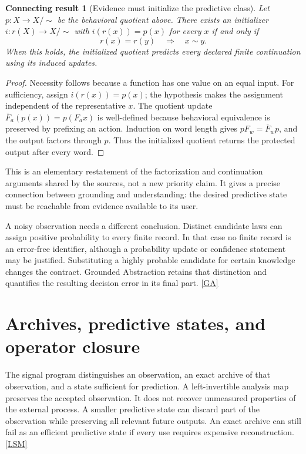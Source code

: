 \documentclass[11pt,oneside]{article}
\newcommand{\src}[1]{\hyperlink{cat:#1}{\textsf{[#1]}}}
\newtheorem{connection}{Connecting result}
\begin{document}
\begin{connection}[Evidence must initialize the predictive class]
Let $p:X\to X/{\sim}$ be the behavioral quotient above. There exists an initializer $i:r(X)\to X/{\sim}$ with $i(r(x))=p(x)$ for every $x$ if and only if
\[
r(x)=r(y)\quad\Longrightarrow\quad x\sim y.
\]
When this holds, the initialized quotient predicts every declared finite continuation using its induced updates.
\end{connection}
\begin{proof}
Necessity follows because a function has one value on an equal input. For sufficiency, assign $i(r(x))=p(x)$; the hypothesis makes the assignment independent of the representative $x$. The quotient update $\overline F_a(p(x))=p(F_ax)$ is well-defined because behavioral equivalence is preserved by prefixing an action. Induction on word length gives $pF_w=\overline F_wp$, and the output factors through $p$. Thus the initialized quotient returns the protected output after every word.
\end{proof}

This is an elementary restatement of the factorization and continuation arguments shared by the sources, not a new priority claim. It gives a precise connection between grounding and understanding: the desired predictive state must be reachable from evidence available to its user.

A noisy observation needs a different conclusion. Distinct candidate laws can assign positive probability to every finite record. In that case no finite record is an error-free identifier, although a probability update or confidence statement may be justified. Substituting a highly probable candidate for certain knowledge changes the contract. Grounded Abstraction retains that distinction and quantifies the resulting decision error in its final part. \src{GA}

\section{Archives, predictive states, and operator closure}
The signal program distinguishes an observation, an exact archive of that observation, and a state sufficient for prediction. A left-invertible analysis map preserves the accepted observation. It does not recover unmeasured properties of the external process. A smaller predictive state can discard part of the observation while preserving all relevant future outputs. An exact archive can still fail as an efficient predictive state if every use requires expensive reconstruction. \src{LSM}
\end{document}
